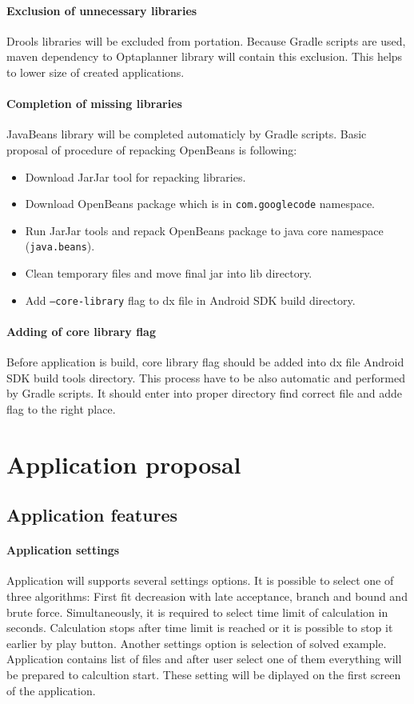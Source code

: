 \paragraph{Exclusion of unnecessary libraries}
Drools libraries will be excluded from portation. Because Gradle scripts are used, maven dependency to Optaplanner
library will contain this exclusion. This helps to lower size of created applications.

\paragraph{Completion of missing libraries}
JavaBeans library will be completed automaticly by Gradle scripts. Basic proposal of procedure of repacking OpenBeans is
following:
\begin{itemize}
\item Download JarJar tool for repacking libraries.
\item Download OpenBeans package which is in \texttt{com.googlecode} namespace.
\item Run JarJar tools and repack OpenBeans package to java core namespace (\texttt{java.beans}).
\item Clean temporary files and move final jar into lib directory.
\item Add \texttt{--core-library} flag to dx file in Android SDK build directory.
\end{itemize}

\paragraph{Adding of core library flag}
Before application is build, core library flag should be added into dx file Android SDK build tools directory. This
process have to be also automatic and performed by Gradle scripts. It should enter into proper directory find correct
file and adde flag to the right place.

\section{Application proposal}

\subsection{Application features}

\paragraph{Application settings}
Application will supports several settings options. It is possible to select one of three algorithms: First fit
decreasion with late acceptance, branch and bound and brute force. Simultaneously, it is required to select time limit
of calculation in seconds. Calculation stops after time limit is reached or it is possible to stop it earlier by play
button. Another settings option is selection of solved example. Application contains list of files and after user select
one of them everything will be prepared to calcultion start. These setting will be diplayed on the first screen of
the application.

